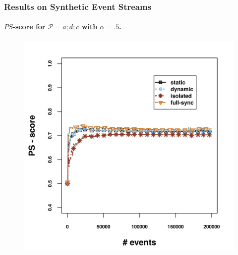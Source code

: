 \begin{frame}
	
	\frametitle{Results on Synthetic Event Streams }
	\framesubtitle{$\mathit{PS}$-score for $\mathcal{P}=a;d;c$ with $\alpha = .5$.}
	
\begin{figure}[H]
	\centering
	\includegraphics[width=.9\textwidth,height=.8\textheight]{../chapters/figures/synthetic/new/ps_score_synthetic.png}
	
\end{figure}
	
\end{frame}



